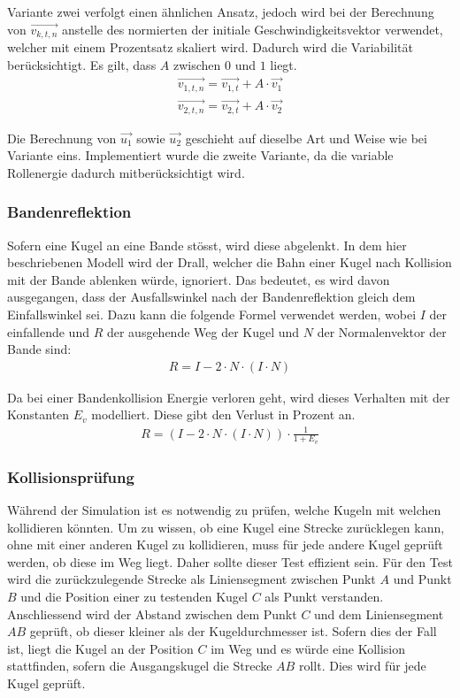 Variante zwei verfolgt einen ähnlichen Ansatz, jedoch wird bei der Berechnung von $\vec{v_{k,t,n}}$ anstelle des normierten
der initiale Geschwindigkeitsvektor verwendet, welcher mit einem Prozentsatz skaliert wird. Dadurch wird die Variabilität
berücksichtigt. Es gilt, dass $A$ zwischen $0$ und $1$ liegt.
\begin{align}
    \vec{v_{1,t,n}} = \vec{v_{1,t}} + A \cdot \vec{v_1}\\
    \vec{v_{2,t,n}} = \vec{v_{2,t}} + A \cdot \vec{v_2}
\end{align}

Die Berechnung von $\vec{u_1}$ sowie $\vec{u_2}$ geschieht auf dieselbe Art und Weise wie bei Variante eins.
Implementiert wurde die zweite Variante, da die variable Rollenergie dadurch mitberücksichtigt wird.

\newpage
\subsubsection{Bandenreflektion}
Sofern eine Kugel an eine Bande stösst, wird diese abgelenkt. In dem hier beschriebenen Modell wird der Drall\cite{wiki.spin:1},
welcher die Bahn einer Kugel nach Kollision mit der Bande ablenken würde, ignoriert.
Das bedeutet, es wird davon ausgegangen, dass der Ausfallswinkel nach der Bandenreflektion gleich dem Einfallswinkel sei.
Dazu kann die folgende Formel\cite{paulbourke.reflected_ray:1} verwendet werden, wobei $I$ der einfallende
und $R$ der ausgehende Weg der Kugel und $N$ der Normalenvektor der Bande sind:
\begin{align}
    R = I - 2 \cdot N \cdot (I \cdot N)
\end{align}

Da bei einer Bandenkollision Energie verloren geht, wird dieses Verhalten mit der Konstanten $E_v$ modelliert.
Diese gibt den Verlust in Prozent an.
\begin{align}
    R = (I - 2 \cdot N \cdot (I \cdot N)) \cdot \frac{1}{1 + E_v}
\end{align}
\subsubsection{Kollisionsprüfung}
Während der Simulation ist es notwendig zu prüfen, welche Kugeln mit welchen kollidieren könnten.
Um zu wissen, ob eine Kugel eine Strecke zurücklegen kann, ohne mit einer anderen Kugel zu kollidieren,
muss für jede andere Kugel geprüft werden, ob diese im Weg liegt. Daher sollte dieser Test effizient sein.
Für den Test wird die zurückzulegende Strecke als Liniensegment zwischen Punkt $A$ und Punkt $B$ und die Position
einer zu testenden Kugel $C$ als Punkt verstanden. Anschliessend wird der Abstand zwischen dem Punkt $C$ und dem
Liniensegment $AB$ geprüft, ob dieser kleiner als der Kugeldurchmesser ist. Sofern dies der Fall ist, liegt die Kugel an
der Position $C$ im Weg und es würde eine Kollision stattfinden, sofern die Ausgangskugel die Strecke $AB$ rollt.
Dies wird für jede Kugel geprüft.

